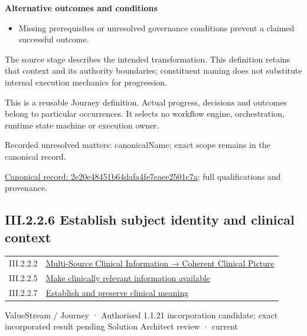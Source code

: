 \par\medskip\textbf{Alternative outcomes and conditions}\par


\begin{itemize}


\item Missing prerequisites or unresolved governance conditions prevent a claimed successful outcome.

\end{itemize}


The source stage describes the intended transformation. This definition retains that context and its authority boundaries; constituent naming does not substitute internal execution mechanics for progression.



This is a reusable Journey definition. Actual progress, decisions and outcomes belong to particular occurrences. It selects no workflow engine, orchestration, runtime state machine or execution owner.


{\small Recorded unresolved matters: canonicalName; exact scope remains in the canonical record.}\par
{\footnotesize \href{../../../../continuum/strategy/value-stream/2e20e48451b64dafa4fe7eaee2501c7a.md}{Canonical record: 2e20e48451b64dafa4fe7eaee2501c7a}; full qualifications and provenance.}\par
\subsection*{III.2.2.6 Establish subject identity and clinical context}
\label{navigation:III.2.2.6}

\begin{longtable}{p{.22\linewidth}p{.73\linewidth}}
III.2.2.2 & \hyperref[element:01f655eae3d8485699449c3dcf4f9b56]{Multi-Source Clinical Information → Coherent Clinical Picture} \\
III.2.2.5 & \hyperref[element:2e20e48451b64dafa4fe7eaee2501c7a]{Make clinically relevant information available} \\
III.2.2.7 & \hyperref[element:e64c4ed500d84f0fa84a12646ea8b98d]{Establish and preserve clinical meaning} \\
\end{longtable}
\label{element:667853f4a4c343dcb559584cb08d71cf}
{\small ValueStream / Journey · Authorised 1.1.21 incorporation candidate; exact incorporated result pending Solution Architect review · current}\par

